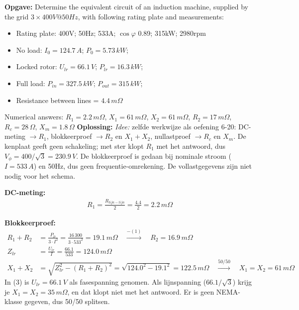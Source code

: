 \begin{oefenblok}
    \textbf{Opgave:}
    \newline
    Determine the equivalent circuit of an induction machine, supplied by the grid
    $3\times400V@50Hz$, with following rating plate and measurements:
    \begin{itemize}
     \item Rating plate: 400V; 50Hz; 533A; $\cos\varphi$ 0.89; 315kW; 2980rpm
     \item No load: $I_0 = 124.7\,A$; $P_0 = 5.73\,kW$;
     \item Locked rotor: $U_{lr} = 66.1\,V$; $P_{lr} = 16.3\,kW$;
     \item Full load: $P_{in} = 327.5\,kW$; $P_{out} = 315\,kW$;
     \item Resistance between lines = $4.4\,m\Omega$
    \end{itemize}
    Numerical answers:
    $R_1=2.2\,m\Omega$, $X_1=61\,m\Omega$, $X_2=61\,m\Omega$, $R_2=17\,m\Omega$,
    $R_c=28\,\Omega$, $X_m=1.8\,\Omega$
    \newline
    \textbf{Oplossing:}
    \newline
    \textit{Idee:} zelfde werkwijze als oefening 6-20: DC-meting $\rightarrow R_1$,
    blokkeerproef $\rightarrow R_2$ en $X_1 + X_2$, nullastproef $\rightarrow R_c$ en $X_m$.
    De kenplaat geeft geen schakeling; met ster klopt $R_1$ met het antwoord, dus
    $V_\phi = 400/\sqrt{3} = 230.9\,V$.
    De blokkeerproef is gedaan bij nominale stroom ($I = 533\,A$) en 50Hz, dus geen
    frequentie-omrekening.
    De vollastgegevens zijn niet nodig voor het schema.

    \textbf{DC-meting:}
    \begin{align}
        R_1 = \frac{R_{lijn-lijn}}{2} = \frac{4.4}{2} = 2.2\,m\Omega \tag{1}
    \end{align}

    \textbf{Blokkeerproef:}
    \begin{align}
        R_1 + R_2 &= \frac{P_{lr}}{3 \cdot I^2} = \frac{16\,300}{3 \cdot 533^2} = 19.1\,m\Omega
        \quad \xrightarrow{-(1)} \quad R_2 = 16.9\,m\Omega \tag{2} \\
        Z_{lr} &= \frac{U_{lr}}{I} = \frac{66.1}{533} = 124.0\,m\Omega \tag{3} \\
        X_1 + X_2 &= \sqrt{Z_{lr}^2 - (R_1 + R_2)^2} = \sqrt{124.0^2 - 19.1^2} = 122.5\,m\Omega
        \quad \xrightarrow{50/50} \quad X_1 = X_2 = 61\,m\Omega \tag{4}
    \end{align}
    In (3) is $U_{lr} = 66.1\,V$ als fasespanning genomen.
    Als lijnspanning ($66.1/\sqrt{3}$) krijg je $X_1 = X_2 = 35\,m\Omega$, en dat
    klopt niet met het antwoord.
    Er is geen NEMA-klasse gegeven, dus 50/50 splitsen.


\end{oefenblok}
